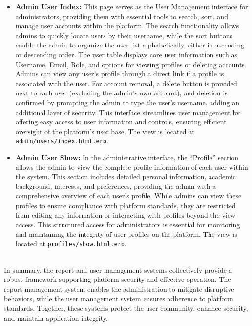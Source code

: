 \begin{enumerate}
\begin{itemize}
            \newpage
            \item \textbf{Admin User Index:} 
            This page serves as the User Management interface for administrators, providing them with essential tools to search, sort, and manage user accounts within the platform. The search functionality allows admins to quickly locate users by their username, while the sort buttons enable the admin to organize the user list alphabetically, either in ascending or descending order. The user table displays core user information such as Username, Email, Role, and options for viewing profiles or deleting accounts. Admins can view any user’s profile through a direct link if a profile is associated with the user. For account removal, a delete button is provided next to each user (excluding the admin’s own account), and deletion is confirmed by prompting the admin to type the user’s username, adding an additional layer of security. This interface streamlines user management by offering easy access to user information and controls, ensuring efficient oversight of the platform’s user base.
            The view is located at \texttt{admin/users/index.html.erb}.
    
            \item \textbf{Admin User Show:} 
            In the administrative interface, the “Profile” section allows the admin to view the complete profile information of each user within the system. This section includes detailed personal information, academic background, interests, and preferences, providing the admin with a comprehensive overview of each user’s profile. While admins can view these profiles to ensure compliance with platform standards, they are restricted from editing any information or interacting with profiles beyond the view access. This structured access for administrators is essential for monitoring and maintaining the integrity of user profiles on the platform. The view is located at \texttt{profiles/show.html.erb}.
            \end{itemize}\bigskip
        
        \\In summary, the report and user management systems collectively provide a robust framework supporting platform security and effective operation. The report management system enables the administration to mitigate disruptive behaviors, while the user management system ensures adherence to platform standards. Together, these systems protect the user community, enhance security, and maintain application integrity.
    \end{enumerate}




















 

    
